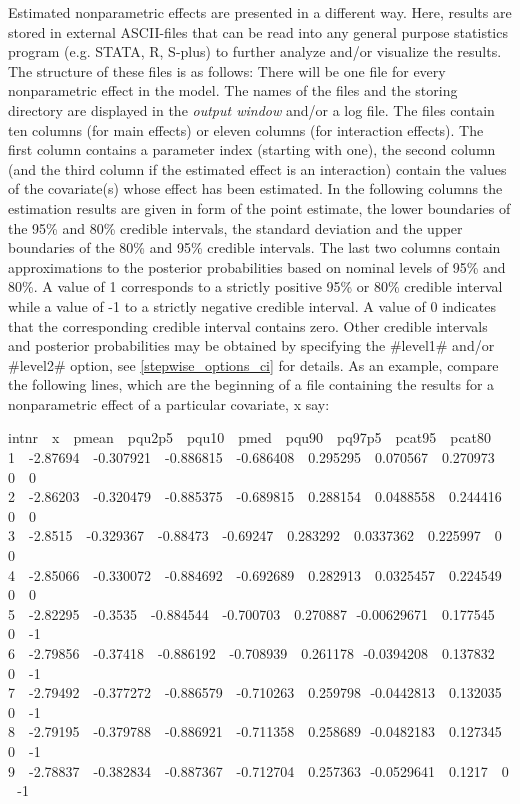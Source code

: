 Estimated nonparametric effects are presented in a different way.
Here, results are stored in external ASCII-files that can be read
into any general purpose statistics program (e.g. STATA, R, S-plus)
to further analyze and/or visualize the results. The structure of
these files is as follows: There will be one file for every
nonparametric effect in the model. The names of the files and the
storing directory are displayed in the {\em output window} and/or a
log file. The files contain ten columns (for main effects) or eleven
columns (for interaction effects). The first column contains a
parameter index (starting with one), the second column (and the
third column if the estimated effect is an interaction) contain the
values of the covariate(s) whose effect has been estimated. In the
following columns the estimation results are given in form of the point estimate,
the lower boundaries of the  95\% and
80\% credible intervals, the standard deviation and the upper
boundaries of the 80\% and 95\% credible intervals. The last two
columns contain approximations to the posterior probabilities based
on nominal levels of 95\% and 80\%. A value of 1 corresponds to a
strictly positive 95\% or 80\% credible interval while a value of -1
to a strictly negative credible interval. A value of 0 indicates
that the corresponding credible interval contains zero. Other
credible intervals and posterior probabilities may be obtained by
specifying the #level1# and/or #level2# option, see
\autoref{stepwise_options_ci} for details. As an example, compare
the following lines, which are the beginning of a file containing
the results for a nonparametric effect of a particular covariate, x
say:

\footnotesize
 intnr \,\, x \,\, pmean \,\, pqu2p5  \,\, pqu10 \,\, pmed \,\, pqu90 \,\, pq97p5 \,\, pcat95 \,\, pcat80\\
 1 \,\, -2.87694 \,\, -0.307921 \,\, -0.886815 \,\, -0.686408 \,\, 0.295295 \,\, 0.070567   \,\, 0.270973 \,\, 0 \,\, 0\\
 2 \,\, -2.86203 \,\, -0.320479 \,\, -0.885375 \,\, -0.689815 \,\, 0.288154 \,\, 0.0488558  \,\, 0.244416 \,\, 0 \,\, 0\\
 3 \,\, -2.8515  \,\, -0.329367 \,\, -0.88473  \,\, -0.69247  \,\, 0.283292 \,\, 0.0337362  \,\, 0.225997 \,\, 0 \,\, 0\\
 4 \,\, -2.85066 \,\, -0.330072 \,\, -0.884692 \,\, -0.692689 \,\, 0.282913 \,\, 0.0325457  \,\, 0.224549 \,\, 0 \,\, 0\\
 5 \,\, -2.82295 \,\, -0.3535   \,\, -0.884544 \,\, -0.700703 \,\, 0.270887 \,\,-0.00629671 \,\, 0.177545 \,\, 0 \,\, -1\\
 6 \,\, -2.79856 \,\, -0.37418  \,\, -0.886192 \,\, -0.708939 \,\, 0.261178 \,\,-0.0394208  \,\, 0.137832 \,\, 0 \,\, -1\\
 7 \,\, -2.79492 \,\, -0.377272 \,\, -0.886579 \,\, -0.710263 \,\, 0.259798 \,\,-0.0442813  \,\, 0.132035 \,\, 0 \,\, -1\\
 8 \,\, -2.79195 \,\, -0.379788 \,\, -0.886921 \,\, -0.711358 \,\, 0.258689 \,\,-0.0482183  \,\, 0.127345 \,\, 0 \,\, -1\\
 9 \,\, -2.78837 \,\, -0.382834 \,\, -0.887367 \,\, -0.712704 \,\, 0.257363 \,\,-0.0529641  \,\, 0.1217   \,\, 0 \,\, -1
\normalsize

